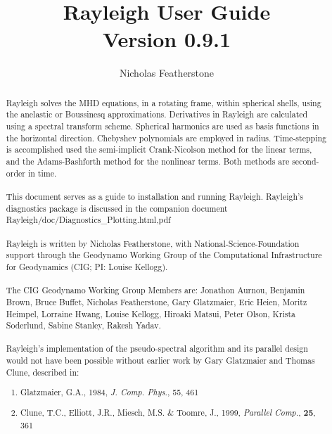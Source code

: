 \documentclass[10pt, letterpaper]{article}
\begin{document}
\title{Rayleigh User Guide \\ Version 0.9.1}
\author{Nicholas Featherstone}

\maketitle

\begin{abstract}

Rayleigh solves the MHD equations, in a rotating frame, within spherical shells, using the anelastic or Boussinesq approximations.  Derivatives in Rayleigh are calculated using a spectral transform scheme.  Spherical harmonics are used as basis functions in the horizontal direction.  Chebyshev polynomials are employed in radius.  Time-stepping is accomplished used the semi-implicit Crank-Nicolson method for the linear terms, and the Adams-Bashforth method for the nonlinear terms.  Both methods are second-order in time.
\\
\\
This document serves as a guide to installation and running Rayleigh.   Rayleigh's diagnostics package is discussed in the companion document Rayleigh/doc/Diagnostics\_Plotting.{html,pdf}
\\
\\
Rayleigh is written by Nicholas Featherstone, with National-Science-Foundation support through the Geodynamo Working Group of the Computational Infrastructure for Geodynamics (CIG; PI: Louise Kellogg).
\\
\\
The CIG Geodynamo Working Group Members are:
Jonathon Aurnou, Benjamin Brown, Bruce Buffet, Nicholas Featherstone, Gary Glatzmaier, Eric Heien, Moritz Heimpel, Lorraine Hwang, Louise Kellogg, Hiroaki Matsui, Peter Olson,  Krista Soderlund, Sabine Stanley, Rakesh Yadav.
\\
\\
\noindent Rayleigh's implementation of the pseudo-spectral algorithm and its parallel design would not have been possible without earlier work by Gary Glatzmaier and Thomas Clune, described in:
\begin{enumerate}
\item Glatzmaier, G.A., 1984, \textit{J. Comp. Phys.}, 55, 461
\item Clune, T.C., Elliott, J.R., Miesch, M.S. \& Toomre, J., 1999, \textit{Parallel Comp.}, \textbf{25}, 361
\end{enumerate}

\end{abstract}
\clearpage
\end{document}
